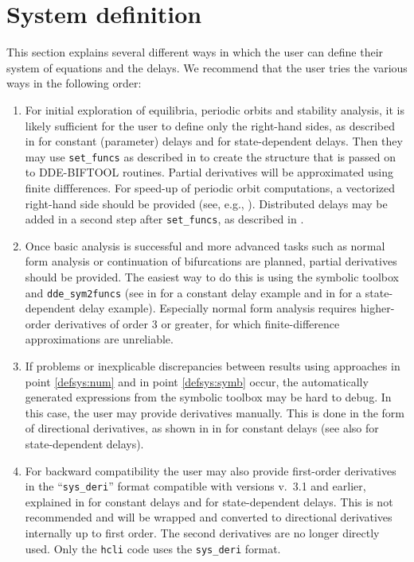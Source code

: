 \documentclass[10pt]{scrartcl}
\newcommand{\DDEBIFCODE}{\textsc{DDE-BIFTOOL}}
\newcommand{\blist}[1]{\mbox{\lstinline!#1!}}
\begin{document}
\section{System definition}\label{sec:system:def}
This section explains several different ways in which the user can
define their system of equations and the delays. We recommend that the
user tries the various ways in the following order:
\begin{enumerate}
\item \label{defsys:num} For initial exploration of equilibria, periodic orbits and
  stability analysis, it is likely sufficient for the user to define only
  the right-hand sides, as described in
   for constant (parameter) delays and
   for state-dependent delays. Then they may
  use \blist{set_funcs} as described in  to create the
  structure that is passed on to \DDEBIFCODE{} routines. Partial
  derivatives will be approximated using finite diffferences. For
  speed-up of periodic orbit computations, a vectorized right-hand
  side should be provided (see, e.g., ). Distributed delays may be added in a second step after \blist{set_funcs}, as described in .
\item \label{defsys:symb} Once basic analysis is successful and more advanced tasks such
  as normal form analysis or continuation of bifurcations are planned,
  partial derivatives should be provided. The easiest way to do this
  is using the symbolic toolbox and \blist{dde_sym2funcs} (see
   in  for a constant delay
  example and  in  for a
  state-dependent delay example). Especially normal form analysis
  requires higher-order derivatives of order $3$ or greater, for which
  finite-difference approximations are unreliable.
\item If problems or inexplicable discrepancies between results using
  approaches in point \ref{defsys:num} and in point \ref{defsys:symb}
  occur, the automatically generated expressions from the symbolic
  toolbox may be hard to debug. In this case, the user may provide
  derivatives manually. This is done in the form of directional derivatives,
  as shown in  in  for
  constant delays (see also  for state-dependent
  delays).
\item For backward compatibility the user may also provide first-order derivatives in the ``\blist{sys_deri}'' format compatible with versions v.~3.1
  and earlier, explained in  for constant delays
  and  for state-dependent delays. This is not
  recommended and will be wrapped and converted to directional
  derivatives internally up to first order. The second derivatives are
  no longer directly used. Only the \blist{hcli} code uses the
  \blist{sys_deri} format.
\end{enumerate}
\end{document}
